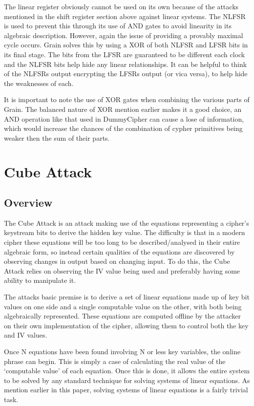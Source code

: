 \documentclass{report}
\let\Oldsection\section
\renewcommand{\section}{\FloatBarrier\Oldsection}
\begin{document}
The linear register obviously cannot be used on its own because of the attacks mentioned in the shift register section above against linear systems. The NLFSR is used to prevent this through its use of AND gates to avoid linearity in its algebraic description. However, again the issue of providing a provably maximal cycle occurs. Grain solves this by using a XOR of both NLFSR and LFSR bits in its final stage. The bits from the LFSR are guaranteed to be different each clock and the NLFSR bits help hide any linear relationships. It can be helpful to think of the NLFSRs output encrypting the LFSRs output (or vica versa), to help hide the weaknesses of each.

It is important to note the use of XOR gates when combining the various parts of Grain. The balanced nature of XOR mention earlier makes it a good choice, an AND operation like that used in DummyCipher can cause a lose of information, which would increase the chances of the combination of cypher primitives being weaker then the sum of their parts.
\chapter{Cube Attack}
\section{Overview}
The Cube Attack is an attack making use of the equations representing a cipher's keystream bits to derive the hidden key value. The difficulty is that in a modern cipher these equations will be too long to be described/analysed in their entire algebraic form, so instead certain qualities of the equations are discovered by observing changes in output based on changing input. To do this, the Cube Attack relies on observing the IV value being used and preferably having some ability to manipulate it.

The attacks basic premise is to derive a set of linear equations made up of key bit values on one side and a single computable value on the other, with both being algebraically represented. These equations are computed offline by the attacker on their own implementation of the cipher, allowing them to control both the key and IV values.

Once N equations have been found involving N or less key variables, the online phrase can begin. This is simply a case of calculating the real value of the `computable value' of each equation. Once this is done, it allows the entire system to be solved by any standard technique for solving systems of linear equations. As mention earlier in this paper, solving systems of linear equations is a fairly trivial task.
\end{document}
